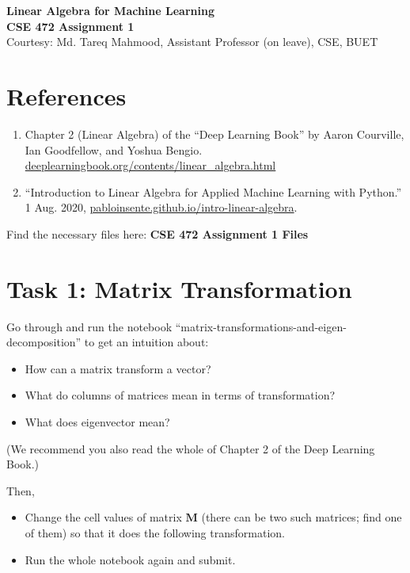 \documentclass[11pt, a4paper]{article}
\begin{document}
\begin{center}
    \textbf{\Large Linear Algebra for Machine Learning} \\[0.5em]
    \textbf{CSE 472 Assignment 1} \\[0.5em]
    \normalsize Courtesy: Md. Tareq Mahmood, Assistant Professor (on leave), CSE, BUET
\end{center}

\vspace{1em}

\section*{References}
\begin{enumerate}
    \item Chapter 2 (Linear Algebra) of the ``Deep Learning Book'' by Aaron Courville, Ian Goodfellow, and Yoshua Bengio. \url{deeplearningbook.org/contents/linear_algebra.html}
    \item ``Introduction to Linear Algebra for Applied Machine Learning with Python.'' 1 Aug. 2020, \url{pabloinsente.github.io/intro-linear-algebra}.
\end{enumerate}

Find the necessary files here: \textbf{CSE 472 Assignment 1 Files}

\section{Task 1: Matrix Transformation}
Go through and run the notebook ``matrix-transformations-and-eigen-decomposition'' to get an intuition about:
\begin{itemize}
    \item How can a matrix transform a vector?
    \item What do columns of matrices mean in terms of transformation?
    \item What does eigenvector mean?
\end{itemize}
(We recommend you also read the whole of Chapter 2 of the Deep Learning Book.)

Then,
\begin{itemize}
    \item Change the cell values of matrix $\mathbf{M}$ (there can be two such matrices; find one of them) so that it does the following transformation.
    \item Run the whole notebook again and submit.
\end{itemize}
\end{document}
